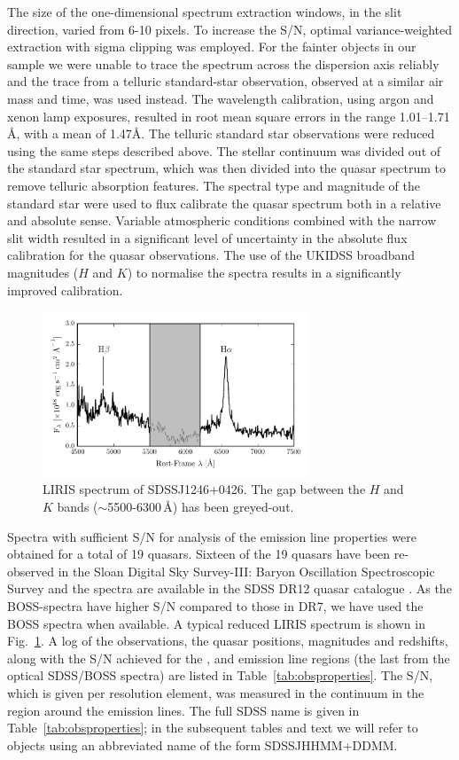 The size of the one-dimensional spectrum extraction windows, in the slit direction, varied from 6-10 pixels. 
To increase the S/N, optimal variance-weighted extraction with sigma clipping was employed. 
For the fainter objects in our sample we were unable to trace the spectrum across the dispersion axis reliably and the trace from a telluric standard-star observation, observed at a similar air mass and time, was used instead. 
The wavelength calibration, using argon and xenon lamp exposures, resulted in root mean square errors in the range 1.01--1.71\,\AA, with a mean of 1.47\AA. 
The telluric standard star observations were reduced using the same steps described above. 
The stellar continuum was divided out of the standard star spectrum, which was then divided into the quasar spectrum to remove telluric absorption features. 
The spectral type and magnitude of the standard star were used to flux calibrate the quasar spectrum both in a relative and absolute sense.
Variable atmospheric conditions combined with the narrow slit width resulted in a significant level of uncertainty in the absolute flux calibration for the quasar observations. 
The use of the UKIDSS broadband magnitudes ($H$ and $K$) to normalise the spectra results in a significantly improved calibration. 

\begin{figure}
    \includegraphics[width=8cm]{figures/chapter02/example_spectrum.pdf} 
    \caption{LIRIS spectrum of SDSSJ1246+0426. The gap between the $H$ and $K$ bands ($\sim$5500-6300\,\AA) has been greyed-out.}
    \label{fig:example_spectrum}
\end{figure}

Spectra with sufficient S/N for analysis of the \ha emission line properties were obtained for a total of 19 quasars. 
Sixteen of the 19 quasars have been re-observed in the Sloan Digital Sky Survey-III: Baryon Oscillation Spectroscopic Survey \citep[SDSS-III/BOSS;][]{dawson13} and the spectra are available in the SDSS DR12 quasar catalogue \citep{paris17}. 
As the BOSS-spectra have higher S/N compared to those in DR7, we have used the BOSS spectra when available.
A typical reduced LIRIS spectrum is shown in Fig.~\ref{fig:example_spectrum}. 
A log of the observations, the quasar positions, magnitudes and redshifts, along with the S/N achieved for the \hbns, \ha and  emission line regions (the last from the optical SDSS/BOSS spectra) are listed in Table~\ref{tab:obsproperties}.
The S/N, which is given per resolution element, was measured in the continuum in the region around the emission lines. 
The full SDSS name is given in Table~\ref{tab:obsproperties}; in the subsequent tables and text we will refer to objects using an abbreviated name of the form SDSSJHHMM+DDMM.

